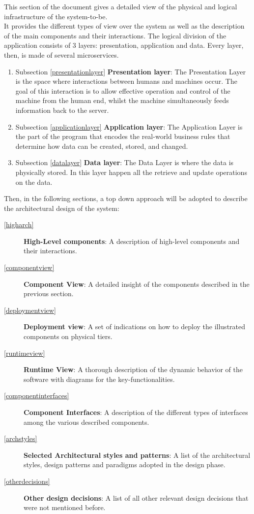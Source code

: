 This section of the document gives a detailed view of the physical and logical infrastructure of the system-to-be. 
\\It provides the different types of view over the system as well as the description of the main components and their interactions.
The logical division of the application consists of 3 layers: presentation, application and data.
Every layer, then, is made of several microservices.
\begin{enumerate}
	\item Subsection \ref{presentationlayer} \textbf{Presentation layer}: The Presentation Layer is the space where interactions between humans and machines occur. The goal of this interaction is to allow effective operation and control of the machine from the human end, whilst the machine simultaneously feeds information back to the server.
	\item Subsection \ref{applicationlayer} \textbf{Application layer}: The Application Layer is the part of the program that encodes the real-world business rules that determine how data can be created, stored, and changed.
	\item Subsection \ref{datalayer} \textbf{Data layer}: The Data Layer is where the data is physically stored. In this layer happen all the retrieve and update operations on the data.
\end{enumerate}

Then, in the following sections, a top down approach will be adopted to describe the architectural design of the system:
\begin{description}
	\item[\ref{higharch}] \textbf{High-Level components}: A description of high-level components and their interactions.
	\item[\ref{componentview}] \textbf{Component View}: A detailed insight of the components described in the previous section.
	\item[\ref{deploymentview}] \textbf{Deployment view}: A set of indications on how to deploy the illustrated components on physical tiers.
	\item[\ref{runtimeview}] \textbf{Runtime View}: A thorough description of the dynamic behavior of the software with diagrams for the key-functionalities.
	\item[\ref{componentinterfaces}] \textbf{Component Interfaces}: A description of the different types of interfaces among the various described components.
	\item[\ref{archstyles}] \textbf{Selected Architectural styles and patterns}: A list of the architectural styles, design patterns and paradigms adopted in the design phase.
	\item[\ref{otherdecisions}] \textbf{Other design decisions}: A list of all other relevant design decisions that were not mentioned before.
\end{description}
